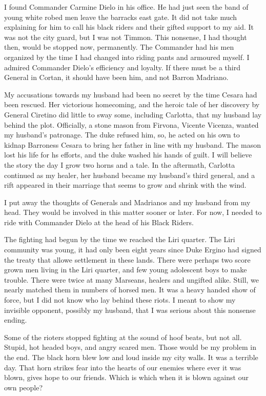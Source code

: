 \documentclass{article}
\begin{document}
I found Commander Carmine Dielo in his office. He had just seen the band of young white robed men leave the barracks east gate. It did not take much explaining for him to call his black riders and their gifted support to my aid. It was not the city guard, but I was not Timmon. This nonsense, I had thought then, would be stopped now, permanently. The Commander had his men organized by the time I had changed into riding pants and armoured myself. I admired Commander Dielo's efficiency and loyalty. If there must be a third General in Cortan, it should have been him, and not Barron Madriano.

My accusations towards my husband had been no secret by the time Cesara had been rescued. Her victorious homecoming, and the heroic tale of her discovery by General Ciretino did little to sway some, including Carlotta, that my husband lay behind the plot. Officially, a stone mason from Firvona, Vicente Vicenza, wanted my husband's patronage. The duke refused him, so, he acted on his own to kidnap Barroness Cesara to bring her father in line with my husband. The mason lost his life for hs efforts, and the duke washed his hands of guilt. I will believe the story the day I grow two horns and a tale. In the aftermath, Carlotta continued as my healer, her husband became my husband's third general, and a rift appeared in their marriage that seems to grow and shrink with the wind.

I put away the thoughts of Generals and Madrianos and my husband from my head. They would be involved in this matter sooner or later. For now, I needed to ride with Commander Dielo at the head of his Black Riders. 

The fighting had begun by the time we reached the Liri quarter. The Liri community was young, it had only been eight years since Duke Ergino had signed the treaty that allowe settlement in these lands. There were perhaps two score grown men living in the Liri quarter, and few young adolescent boys to make trouble. There were twice at many Marseans, healers and ungifted alike. Still, we nearly matched them in numbers of horsed men. It was a heavy handed show of force, but I did not know who lay behind these riots. I meant to show my invisible opponent, possibly my husband, that I was serious about this nonsense ending. 

Some of the rioters stopped fighting at the sound of hoof beats, but not all. Stupid, hot headed boys, and angry scared men. Those would be my problem in the end. The black horn blew low and loud inside my city walls. It was a terrible day. That horn strikes fear into the hearts of our enemies where ever it was blown, gives hope to our friends. Which is which when it is blown against our own people? 
\end{document}
